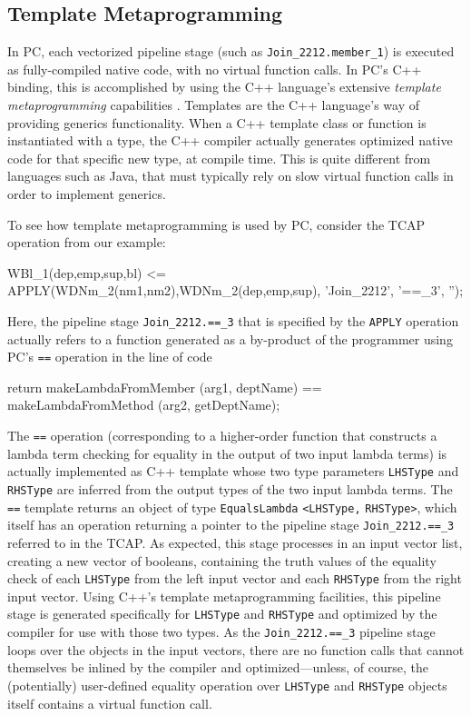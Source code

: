 \subsection{Template Metaprogramming}

In PC,
each vectorized pipeline stage (such as \texttt{Join\_2212.member\_1}) is executed as fully-compiled native code, with no virtual function
calls.
In PC's C++ binding, this is accomplished by using the C++ language's extensive \emph{template metaprogramming} 
capabilities \cite{josuttis2012c++}.  Templates are the C++ language's way of providing generics functionality.
When a C++ template class or
function is instantiated with a type, %
the C++ compiler actually generates optimized native code for that specific new type, at compile time.  
This is quite different from languages
such as Java, that must typically rely on slow virtual
function calls in order to implement generics.

To see how template metaprogramming is used by PC, consider
the TCAP operation from our example:

\begin{codesmall}
WBl_1(dep,emp,sup,bl) <= 
   APPLY(WDNm_2(nm1,nm2),WDNm_2(dep,emp,sup), 'Join_2212', '==_3', '');
\end{codesmall}

\noindent
Here, the pipeline stage \texttt{Join\_2212.==\_3} that is specified by the \texttt{APPLY} operation
actually refers to a function generated as a by-product of the
programmer using PC's \texttt{==} operation
in the line of code

\begin{codesmall} 
	return makeLambdaFromMember (arg1, deptName) == 
	       makeLambdaFromMethod (arg2, getDeptName); 
\end{codesmall}

\noindent The \texttt{==} 
operation (corresponding to a higher-order function that
constructs a lambda term checking for equality in the output of two input lambda terms) is actually implemented as C++ template
whose two type parameters \texttt{LHSType} and \texttt{RHSType} are inferred from
the output types of the two input lambda terms. 
The \texttt{==} template returns an object of type \texttt{EqualsLambda} \texttt{<LHSType,} \texttt{RHSType>}, which
itself has an operation returning a pointer to the pipeline stage \texttt{Join\_2212.==\_3} referred to in the TCAP.
As expected, this stage processes in an input vector list,
creating a new vector of booleans, containing the truth values of the equality check of each \texttt{LHSType} from the left
input vector and each \texttt{RHSType} from the right input vector.
Using C++'s template metaprogramming facilities, this 
pipeline stage is generated specifically for \texttt{LHSType} and \texttt{RHSType} and optimized by the compiler for use with those
two types.  
As the \texttt{Join\_2212.==\_3} pipeline stage loops over the objects in the input vectors, 
there are no function calls that cannot themselves be inlined by the compiler
and optimized---unless, of course, the (potentially) user-defined equality operation over \texttt{LHSType} and \texttt{RHSType}
objects itself contains a virtual function call.

